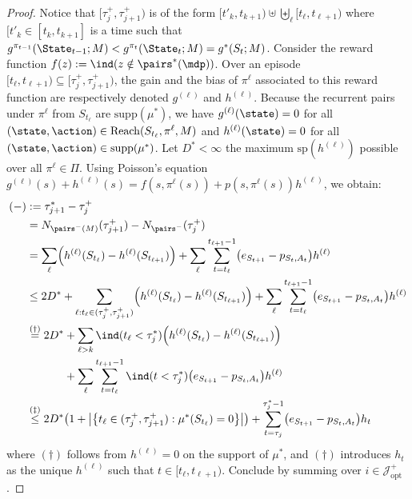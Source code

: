\documentclass[preprint,cleveref,12pt]{colt2025}
\DeclarePairedDelimiter{\braces}{\{}{\}}	%
\DeclarePairedDelimiter{\parens}{(}{)}	%
\DeclarePairedDelimiter{\abs}{\lvert}{\rvert}	%
\newcommand{\indic}[1]{\ind\parens{#1}}
\def\indicator{\indic}
\def\model{\mdp}
\def\Reach{\mathrm{Reach}}
\begin{document}
    \begin{proof}
        Notice that $[\tau_j^+, \tau_{j+1}^+)$ is of the form $[t'_k, t_{k+1}) \uplus \biguplus_\ell [t_\ell, t_{\ell+1})$ where $[t'_k \in [t_k, t_{k+1}]$ is a time such that $g^{\pi_{t-1}}(\State_{t-1}; M) < g^{\pi_t}(\State_t; M) = g^*(S_t;M)$.
        Consider the reward function $f(z) := \indicator{z \notin \pairs^*(\model)}$.
        Over an episode $[t_\ell, t_{\ell+1}) \subseteq [\tau_j^+, \tau_{j+1}^+)$, the gain and the bias of $\pi^\ell$ associated to this reward function are respectively denoted $g^{(\ell)}$ and $h^{(\ell)}$. 
        Because the recurrent pairs under $\pi^\ell$ from $S_{t_\ell}$ are $\mathrm{supp}(\mu^*)$, we have $g^{(\ell)}(\state) = 0$ for all $(\state,\action) \in \Reach(S_{t_\ell}, \pi^\ell, M)$ and $h^{(\ell)}(\state) = 0$ for all $(\state,\action) \in \mathrm{supp}(\mu^*)$.
        Let $D^* < \infty$ the maximum $\mathrm{sp}(h^{(\ell)})$ possible over all $\pi^\ell \in \Pi$.
        Using Poisson's equation $g^{(\ell)}(s) + h^{(\ell)}(s) = f(s, \pi^\ell(s)) + p(s, \pi^\ell(s)) h^{(\ell)}$, we obtain:
        \begin{align*}
            (-) 
            & := \tau_{j+1}^* - \tau_j^+
            \\
            & = N_{\pairs^-(M)}(\tau_{j+1}^+) - N_{\pairs^-}(\tau_j^+) 
            \\
            & = 
            \sum_\ell 
            \parens*{h^{(\ell)}(S_{t_\ell}) - h^{(\ell)}(S_{t_{\ell+1}})}
            + \sum_\ell \sum_{t=t_\ell}^{t_{\ell+1}-1}
            \parens*{e_{S_{t+1}} - p_{S_t, A_t}} h^{(\ell)}
            \\
            & \le 
            2 D^*
            + \sum_{\ell: t_\ell \in (\tau_j^+, \tau_{j+1}^+)}
            \parens*{h^{(\ell)}(S_{t_\ell}) - h^{(\ell)}(S_{t_{\ell+1}})}
            + \sum_\ell \sum_{t=t_\ell}^{t_{\ell+1}-1}
            \parens*{e_{S_{t+1}} - p_{S_t, A_t}} h^{(\ell)}
            \\
            & \overset{(\dagger)}=
            2 D^*
            + \sum_{\ell > k}
            \indicator{t_\ell < \tau_j^*}
            \parens*{h^{(\ell)}(S_{t_\ell}) - h^{(\ell)}(S_{t_{\ell+1}})}
            \\
            & \phantom{
                {} \overset{(\dagger)}=
                2 D^*
            }
            {} + \sum_\ell \sum_{t=t_\ell}^{t_{\ell+1}-1}
            \indicator{t < \tau_j^*}
            \parens*{e_{S_{t+1}} - p_{S_t, A_t}} h^{(\ell)}
            \\
            & \overset{(\ddagger)}\le
            2 D^* \parens*{
                1 + \abs*{\braces*{
                    t_\ell \in (\tau_j^+, \tau_{j+1}^+) : \mu^*(S_{t_\ell}) = 0
                }}
            }
            + \sum_{t=\tau_j}^{\tau_j^*-1}
            \parens*{e_{S_{t+1}} - p_{S_t, A_t}} h_t
        \end{align*}
        where $(\dagger)$ follows from $h^{(\ell)} = 0$ on the support of $\mu^*$, and $(\dagger)$ introduces $h_t$ as the unique $h^{(\ell)}$ such that $t \in [t_\ell, t_{\ell+1})$.
        Conclude by summing over $i \in \mathcal{J}^+_\mathrm{opt}$.
    \end{proof}
\end{document}
